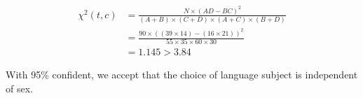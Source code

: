 \documentclass[11pt,a4paper]{report}
\begin{document}
\begin{multicols*}{2}
\begin{equation*}
\begin{split}
   \chi^2(t,c) &= \frac{N\times (AD - BC)^2}{(A+B) \times (C+D) \times (A+C) \times (B+D)} \\
   &= \frac{90\times ((39 \times 14) - (16 \times 21))^2}{55\times 35 \times 60 \times 30}\\
   &= 1.145 > 3.84
\end{split}
\end{equation*}

\noindent With 95\% confident, we accept that the choice of language subject is independent of sex. 

\end{multicols*}
\end{document}
